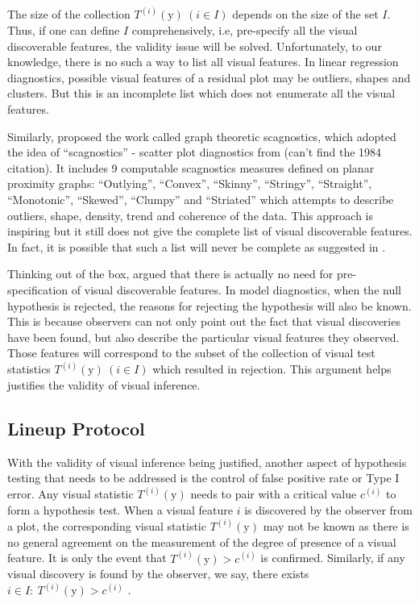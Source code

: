 \documentclass{monashthesis}
\begin{document}
The size of the collection \(T^{(i)}(\boldsymbol{\mathrm{y}})~(i \in I)\) depends on the size of the set \(I\). Thus, if one can define \(I\) comprehensively, i.e, pre-specify all the visual discoverable features, the validity issue will be solved. Unfortunately, to our knowledge, there is no such a way to list all visual features. In linear regression diagnostics, possible visual features of a residual plot may be outliers, shapes and clusters. But this is an incomplete list which does not enumerate all the visual features.

Similarly, \textcite{wilkinson_graph-theoretic_2005} proposed the work called graph theoretic scagnostics, which adopted the idea of ``scagnostics'' - scatter plot diagnostics from (can't find the 1984 citation). It includes 9 computable scagnostics measures defined on planar proximity graphs: ``Outlying'', ``Convex'', ``Skinny'', ``Stringy'', ``Straight'', ``Monotonic'', ``Skewed'', ``Clumpy'' and ``Striated'' which attempts to describe outliers, shape, density, trend and coherence of the data. This approach is inspiring but it still does not give the complete list of visual discoverable features. In fact, it is possible that such a list will never be complete as suggested in \textcite{buja_statistical_2009}.

Thinking out of the box, \textcite{buja_statistical_2009} argued that there is actually no need for pre-specification of visual discoverable features. In model diagnostics, when the null hypothesis is rejected, the reasons for rejecting the hypothesis will also be known. This is because observers can not only point out the fact that visual discoveries have been found, but also describe the particular visual features they observed. Those features will correspond to the subset of the collection of visual test statistics \(T^{(i)}(\boldsymbol{\mathrm{y}})~(i \in I)\) which resulted in rejection. This argument helps justifies the validity of visual inference.

\hypertarget{lineup-protocol-1}{%
\subsection{Lineup Protocol}\label{lineup-protocol-1}}

With the validity of visual inference being justified, another aspect of hypothesis testing that needs to be addressed is the control of false positive rate or Type I error. Any visual statistic \(T^{(i)}(\boldsymbol{\mathrm{y}})\) needs to pair with a critical value \(c^{(i)}\) to form a hypothesis test. When a visual feature \(i\) is discovered by the observer from a plot, the corresponding visual statistic \(T^{(i)}(\boldsymbol{\mathrm{y}})\) may not be known as there is no general agreement on the measurement of the degree of presence of a visual feature. It is only the event that \(T^{(i)}(\boldsymbol{\mathrm{y}}) > c^{(i)}\) is confirmed. Similarly, if any visual discovery is found by the observer, we say, there exists \(i \in I:~T^{(i)}(\boldsymbol{\mathrm{y}}) > c^{(i)}\) \autocite{buja_statistical_2009}.
\end{document}
